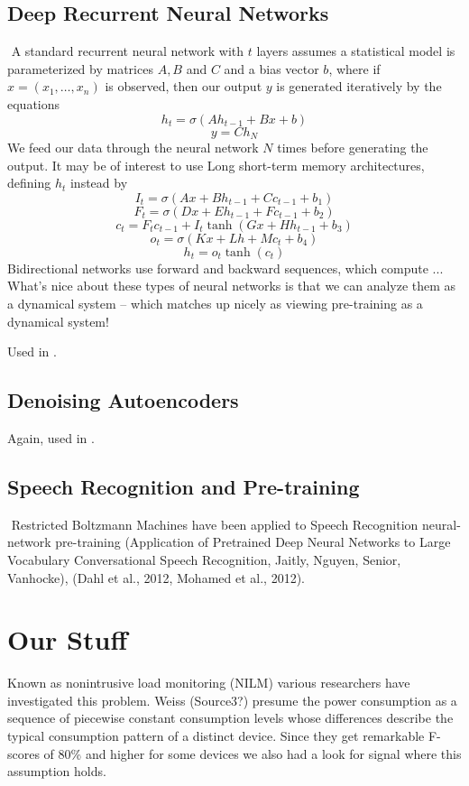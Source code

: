 \documentclass{article}
\begin{document}
\subsection{Deep Recurrent Neural Networks}
​
A standard recurrent neural network with $t$ layers assumes a statistical model is parameterized by matrices $A,B$ and $C$ and a bias vector $b$, where if $x = (x_1, \dots, x_n)$ is observed, then our output $y$ is generated iteratively by the equations
%
\[ h_t = \sigma(A h_{t-1} + B x + b) \]
%
\[ y = C h_N \]
%
We feed our data through the neural network $N$ times before generating the output.
It may be of interest to use Long short-term memory architectures, defining $h_t$ instead by
%
\[ I_t = \sigma(Ax + B h_{t-1} + C c_{t-1} + b_1) \]
%
\[ F_t = \sigma(Dx + E h_{t-1} + F c_{t-1} + b_2) \]
%
\[ c_t = F_t c_{t-1} + I_t \tanh(G x + H h_{t-1} + b_3) \]
%
\[ o_t = \sigma(K x + L h + M c_t + b_4) \]
%
\[ h_t = o_t \tanh(c_t) \]
​
Bidirectional networks use forward and backward sequences, which compute ...
​
What's nice about these types of neural networks is that we can analyze them as a dynamical system -- which matches up nicely as viewing pre-training as a dynamical system!

Used in \cite{Kelly}.

\subsection{Denoising Autoencoders}

Again, used in \cite{Kelly}.
​
\subsection{Speech Recognition and Pre-training}
​
Restricted Boltzmann Machines have been applied to Speech Recognition neural-network pre-training (Application of Pretrained Deep
Neural Networks to Large
Vocabulary Conversational Speech
Recognition, Jaitly, Nguyen, Senior, Vanhocke), (Dahl et al., 2012, Mohamed et al., 2012).




\section{Our Stuff}

Known as nonintrusive load monitoring (NILM) various researchers have investigated this problem.
Weiss (Source3?) presume the power consumption as a sequence of piecewise constant consumption levels whose differences describe the typical consumption pattern of a distinct device.
Since they get remarkable F-scores of 80\% and higher for some devices we also had a look for signal where this assumption holds.
\end{document}
